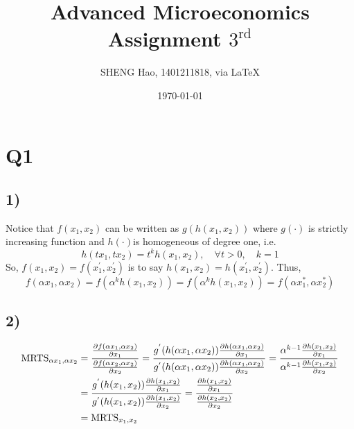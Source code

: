 \documentclass{article}
\begin{document}
\title{Advanced Microeconomics\\Assignment $3^{\text{rd}}$}
\author{{\normalsize SHENG Hao, 1401211818, via \LaTeX}}
\date{\today}

\maketitle

\def \Pr{{\rm Pr}}
\baselineskip 0.6cm
\section*{Q1}
\subsection*{1)}
Notice that $f(x_1,x_2)$ can be written as $g(h(x_1,x_2))$ where $g(\cdot)$ is strictly increasing function and $h(\cdot)$is homogeneous of degree one, i.e.
\begin{equation}
	h(tx_1,tx_2) = t^kh(x_1,x_2),\quad \forall t>0, \quad k=1
\end{equation}
So, $f(x_1,x_2) = f(x^{'}_1,x^{'}_2)$ is to say $h(x_1,x_2) = h(x^{'}_1,x^{'}_2)$. Thus,
\begin{equation}
	f(\alpha x_1, \alpha x_2) = f(\alpha^k h(x_1,x_2))=f(\alpha^k h(x_1,x_2)) = f(\alpha x^{*}_1, \alpha x^{*}_2)
\end{equation}
\rightline{$\blacksquare$}

\subsection*{2)}
\begin{align}\notag
	\text{MRTS}_{\alpha x_1,\alpha x_2} &= \frac{\frac{\partial f(\alpha x_1, \alpha x_2)}{\partial x_1}}{\frac{\partial f(\alpha x_2, \alpha x_2)}{\partial x_2}}
	= \frac{g^{'}(h(\alpha x_1, \alpha x_2))\frac{\partial h(\alpha x_1, \alpha x_2)}{\partial x_1}}{g^{'}(h(\alpha x_1, \alpha x_2))\frac{\partial h(\alpha x_1, \alpha x_2)}{\partial x_2}} 
	= \frac{\alpha^{k-1} \frac{\partial h(x_1, x_2)}{\partial x_1}}{\alpha^{k-1} \frac{\partial h(x_1, x_2)}{\partial x_2}}\\ \notag
	&=\frac{g^{'}(h( x_1,  x_2))\frac{\partial h( x_1,  x_2)}{\partial x_1}}{g^{'}(h( x_1,  x_2))\frac{\partial h( x_1,  x_2)}{\partial x_2}}
	= \frac{\frac{\partial h( x_1,  x_2)}{\partial x_1}}{\frac{\partial h( x_2,  x_2)}{\partial x_2}} \\ \notag
	&= \text{MRTS}_{ x_1, x_2} 
\end{align}
\rightline{$\blacksquare$}
\end{document}
